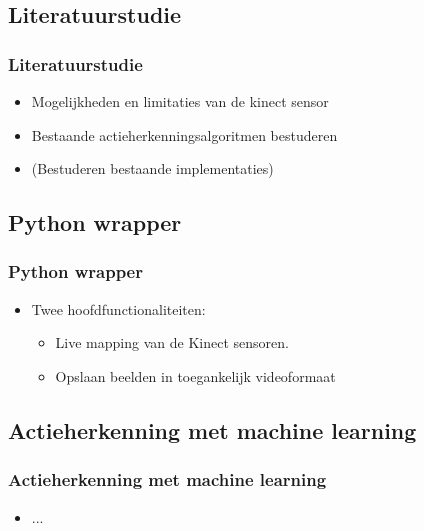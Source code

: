 \documentclass[notes]{beamer}
\begin{document}
	\subsection{Literatuurstudie}
	\begin{frame}
	\frametitle{Literatuurstudie}
		\begin{itemize}
			\item<1- > Mogelijkheden en limitaties van de kinect sensor
			\item<2- > Bestaande actieherkenningsalgoritmen bestuderen
			\item<3- > (Bestuderen bestaande implementaties)
		\end{itemize}
	\end{frame}

	\subsection{Python wrapper}
	\begin{frame}
	\frametitle{Python wrapper}
		\begin{itemize}
			\item Twee hoofdfunctionaliteiten:
			\begin{itemize}
				\item<1- > Live mapping van de Kinect sensoren.
				\item<2- > Opslaan beelden in toegankelijk videoformaat
			\end{itemize}
		\end{itemize}
	\end{frame}

	\subsection{Actieherkenning met machine learning}
		\begin{frame}
		\frametitle{Actieherkenning met machine learning}
		\begin{itemize}
			\item ...
		\end{itemize}
	\end{frame}
\end{document}
